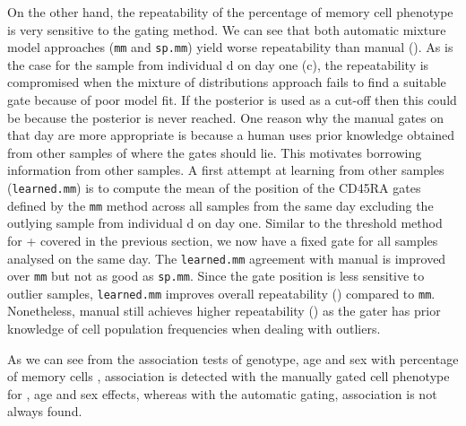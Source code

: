 On the other hand, the repeatability of the percentage of memory cell phenotype is very sensitive to the gating method.
We can see that both automatic mixture model approaches (\texttt{mm} and \texttt{sp.mm}) yield worse repeatability than manual ().
As is the case for the sample from individual d on day one (c),
the repeatability is compromised when the mixture of distributions approach fails to find a suitable gate because of poor model fit.
If the posterior is used as a cut-off then this could be because the posterior is never reached.
One reason why the manual gates on that day are more appropriate is because a human uses prior knowledge obtained from other samples of where the gates should lie.
This motivates borrowing information from other samples.
A first attempt at learning from other samples (\texttt{learned.mm}) is to compute the mean of the position of the CD45RA gates defined by the \texttt{mm}
method across all samples from the same day excluding the outlying sample from individual d on day one.
Similar to the threshold method for + covered in the previous section, we now have a fixed gate for all samples analysed on the same day.
The \texttt{learned.mm} agreement with manual is improved over \texttt{mm} but not as good as \texttt{sp.mm}.
Since the gate position is less sensitive to outlier samples, \texttt{learned.mm} improves overall repeatability () compared to
\texttt{mm}.
Nonetheless, manual still achieves higher repeatability () as
the gater has prior knowledge of cell population frequencies when dealing with outliers.

As we can see from the association tests of genotype, age and sex with percentage of memory cells ,
association is detected with the manually gated cell phenotype for , age and sex effects,
whereas with the automatic gating, association is not always found.

